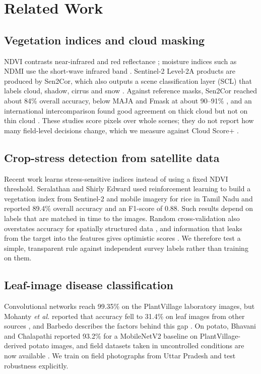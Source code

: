 \documentclass[conference]{IEEEtran}
\begin{document}
\section{Related Work}
\subsection{Vegetation indices and cloud masking}
NDVI contrasts near-infrared and red reflectance \cite{r4,r5}; moisture indices such as NDMI use the short-wave infrared band \cite{r8}. Sentinel-2 Level-2A products are produced by Sen2Cor, which also outputs a scene classification layer (SCL) that labels cloud, shadow, cirrus and snow \cite{r9}. Against reference masks, Sen2Cor reached about 84\% overall accuracy, below MAJA and Fmask at about 90--91\% \cite{r10}, and an international intercomparison found good agreement on thick cloud but not on thin cloud \cite{r11}. These studies score pixels over whole scenes; they do not report how many field-level decisions change, which we measure against Cloud Score+ \cite{r12}.

\subsection{Crop-stress detection from satellite data}
Recent work learns stress-sensitive indices instead of using a fixed NDVI threshold. Seralathan and Shirly Edward \cite{r13} used reinforcement learning to build a vegetation index from Sentinel-2 and mobile imagery for rice in Tamil Nadu and reported 89.4\% overall accuracy and an F1-score of 0.88. Such results depend on labels that are matched in time to the images. Random cross-validation also overstates accuracy for spatially structured data \cite{r14}, and information that leaks from the target into the features gives optimistic scores \cite{r15}. We therefore test a simple, transparent rule against independent survey labels rather than training on them.

\subsection{Leaf-image disease classification}
Convolutional networks reach 99.35\% on the PlantVillage laboratory images, but Mohanty \emph{et al.} reported that accuracy fell to 31.4\% on leaf images from other sources \cite{r16}, and Barbedo describes the factors behind this gap \cite{r17}. On potato, Bhavani and Chalapathi \cite{r18} reported 93.2\% for a MobileNetV2 baseline on PlantVillage-derived potato images, and field datasets taken in uncontrolled conditions are now available \cite{r19,r20}. We train on field photographs from Uttar Pradesh and test robustness explicitly.
\end{document}
